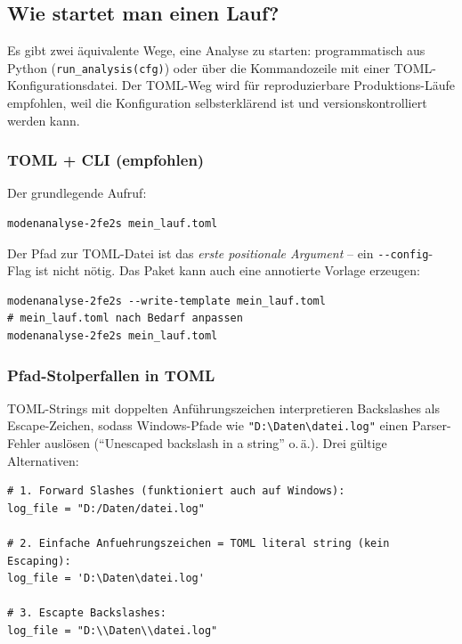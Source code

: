 \documentclass[11pt,a4paper,twoside]{article}
\theoremstyle{remark}
\begin{document}
\subsection{Wie startet man einen Lauf?}
\label{sec:workflow-how-to-start}

Es gibt zwei \"aquivalente Wege, eine Analyse zu starten:
programmatisch aus Python (\texttt{run\_analysis(cfg)}) oder \"uber
die Kommandozeile mit einer TOML-Konfigurationsdatei. Der TOML-Weg
wird f\"ur reproduzierbare Produktions-L\"aufe empfohlen, weil die
Konfiguration selbsterkl\"arend ist und versionskontrolliert werden
kann.

\subsubsection*{TOML + CLI (empfohlen)}

Der grundlegende Aufruf:

\begin{lstlisting}[style=bash]
modenanalyse-2fe2s mein_lauf.toml
\end{lstlisting}

Der Pfad zur TOML-Datei ist das \emph{erste positionale Argument}
-- ein \texttt{-{}-config}-Flag ist nicht n\"otig. Das Paket kann
auch eine annotierte Vorlage erzeugen:

\begin{lstlisting}[style=bash]
modenanalyse-2fe2s --write-template mein_lauf.toml
# mein_lauf.toml nach Bedarf anpassen
modenanalyse-2fe2s mein_lauf.toml
\end{lstlisting}

\subsubsection*{Pfad-Stolperfallen in TOML}

TOML-Strings mit doppelten Anf\"uhrungszeichen interpretieren
Backslashes als Escape-Zeichen, sodass Windows-Pfade wie
\texttt{"D:\textbackslash{}Daten\textbackslash{}datei.log"} einen
Parser-Fehler ausl\"osen (``Unescaped backslash in a string'' o.\,\"a.).
Drei g\"ultige Alternativen:

\begin{lstlisting}[style=bash]
# 1. Forward Slashes (funktioniert auch auf Windows):
log_file = "D:/Daten/datei.log"

# 2. Einfache Anfuehrungszeichen = TOML literal string (kein Escaping):
log_file = 'D:\Daten\datei.log'

# 3. Escapte Backslashes:
log_file = "D:\\Daten\\datei.log"
\end{lstlisting}
\end{document}
